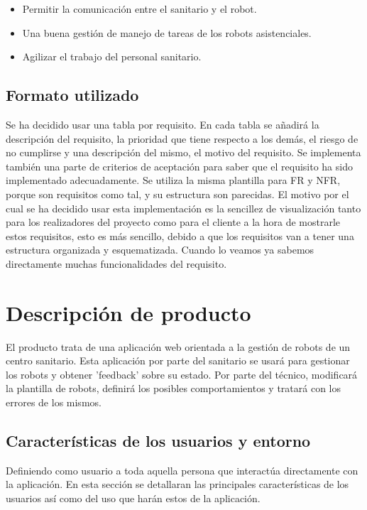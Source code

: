 \documentclass{scrreprt}
\begin{document}
\begin{itemize}
    \item Permitir la comunicación entre el sanitario y el robot. 
    \item Una buena gestión de manejo de tareas de los robots asistenciales.
    \item Agilizar el trabajo del personal sanitario. 
\end{itemize}

\section{Formato utilizado}

Se ha decidido usar una tabla por requisito. En cada tabla se añadirá la descripción del requisito, la prioridad que tiene respecto a los demás, el riesgo de no cumplirse y una descripción del mismo, el motivo del requisito. Se implementa también una parte de criterios de aceptación para saber que el requisito ha sido implementado adecuadamente. Se utiliza la misma plantilla para FR y NFR, porque son requisitos como tal, y su estructura son parecidas. El motivo por el cual se ha decidido usar esta implementación es la sencillez de visualización tanto para los realizadores del proyecto como para el cliente a la hora de mostrarle estos requisitos, esto es más sencillo, debido a que los requisitos van a tener una estructura organizada y esquematizada. Cuando lo veamos ya sabemos directamente muchas funcionalidades del requisito.  



\chapter{Descripción de producto}
El producto trata de una aplicación web orientada a la gestión de robots de un centro sanitario. Esta aplicación por parte del sanitario se usará para gestionar los robots y obtener 'feedback' sobre su estado. Por parte del técnico, modificará la plantilla de robots, definirá los posibles comportamientos y tratará con los errores de los mismos.

\section{Características de los usuarios y entorno }

Definiendo como usuario a toda aquella persona que interactúa directamente con la aplicación. En esta sección se detallaran las principales características de los usuarios así como del uso que harán estos de la aplicación. 
\end{document}
